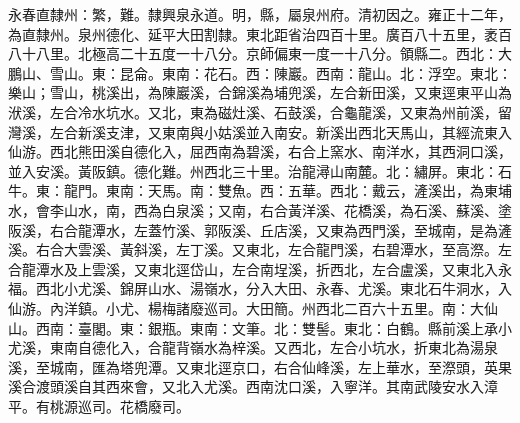 \begin{pinyinscope}
永春直隸州：繁，難。隸興泉永道。明，縣，屬泉州府。清初因之。雍正十二年，為直隸州。泉州德化、延平大田割隸。東北距省治四百十里。廣百八十五里，袤百八十八里。北極高二十五度一十八分。京師偏東一度一十八分。領縣二。西北：大鵬山、雪山。東：昆侖。東南：花石。西：陳巖。西南：龍山。北：浮空。東北：樂山；雪山，桃溪出，為陳巖溪，合錦溪為埔兜溪，左合新田溪，又東逕東平山為洑溪，左合冷水坑水。又北，東為磁灶溪、石鼓溪，合龜龍溪，又東為州前溪，留灣溪，左合新溪支津，又東南與小姑溪並入南安。新溪出西北天馬山，其經流東入仙游。西北熊田溪自德化入，屈西南為碧溪，右合上窯水、南洋水，其西洞口溪，並入安溪。黃阪鎮。德化難。州西北三十里。治龍潯山南麓。北：繡屏。東北：石牛。東：龍門。東南：天馬。南：雙魚。西：五華。西北：戴云，滻溪出，為東埔水，會李山水，南，西為白泉溪；又南，右合黃洋溪、花橋溪，為石溪、蘇溪、塗阪溪，右合龍潭水，左蓋竹溪、郭阪溪、丘店溪，又東為西門溪，至城南，是為滻溪。右合大雲溪、黃斜溪，左丁溪。又東北，左合龍門溪，右碧潭水，至高漈。左合龍潭水及上雲溪，又東北逕岱山，左合南埕溪，折西北，左合盧溪，又東北入永福。西北小尤溪、錦屏山水、湯嶺水，分入大田、永春、尤溪。東北石牛洞水，入仙游。內洋鎮。小尤、楊梅諸廢巡司。大田簡。州西北二百六十五里。南：大仙山。西南：臺閣。東：銀瓶。東南：文筆。北：雙髻。東北：白鶴。縣前溪上承小尤溪，東南自德化入，合龍背嶺水為梓溪。又西北，左合小坑水，折東北為湯泉溪，至城南，匯為塔兜潭。又東北逕京口，右合仙峰溪，左上華水，至漈頭，英果溪合渡頭溪自其西來會，又北入尤溪。西南沈口溪，入寧洋。其南武陵安水入漳平。有桃源巡司。花橋廢司。


\end{pinyinscope}